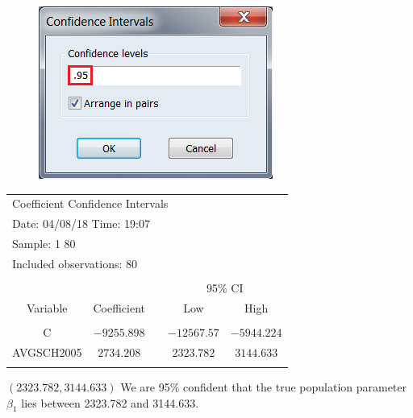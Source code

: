 \documentclass[12pt]{report}
\begin{document}
\vspace{-\baselineskip}
\begin{figure}[H]
	\centering
	\includegraphics{tute6_q4_10}
\end{figure}
\vspace{-\baselineskip}
\begin{table}[H]
	\centering
	\begin{tabular}{lrrrr}
		\multicolumn{5}{l}{Coefficient Confidence Intervals}\\
		\multicolumn{4}{l}{Date: 04/08/18   Time: 19:07}&\multicolumn{1}{c}{}\\
		\multicolumn{3}{l}{Sample: 1 80}&\multicolumn{1}{c}{}&\multicolumn{1}{c}{}\\
		\multicolumn{4}{l}{Included observations: 80}&\multicolumn{1}{c}{}\\
		[4.5pt] \hline \\ [-4.5pt]
		\multicolumn{1}{c}{}&\multicolumn{1}{c}{}&\multicolumn{1}{c}{}&\multicolumn{2}{c}{95\% CI}\\
		\multicolumn{1}{c}{Variable}&\multicolumn{1}{c}{Coefficient}&\multicolumn{1}{c}{}&\multicolumn{1}{c}{Low}&\multicolumn{1}{c}{High}\\
		[4.5pt] \hline \\ [-4.5pt]
		\multicolumn{1}{c}{C}&\multicolumn{1}{c}{$-9255.898$}&\multicolumn{1}{c}{}&\multicolumn{1}{c}{$-12567.57$}&\multicolumn{1}{c}{$-5944.224$}\\
		\multicolumn{1}{c}{AVGSCH2005}&\multicolumn{1}{c}{$2734.208$}&\multicolumn{1}{c}{}&\multicolumn{1}{c}{$2323.782$}&\multicolumn{1}{c}{$3144.633$}\\
		[4.5pt] \hline \\ [-4.5pt]
	\end{tabular}
\end{table} \vspace{-\baselineskip}
\centering $(2323.782,3144.633)$
\justify \noindent We are 95\% confident that the true population parameter $\beta_1$ lies between 2323.782 and 3144.633.
\end{document}

